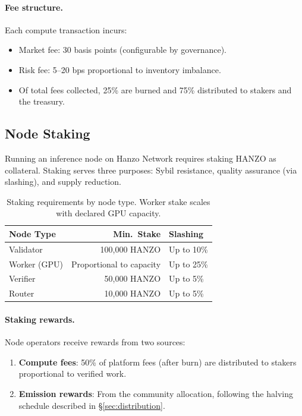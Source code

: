 \documentclass[11pt]{article}
\begin{document}
\paragraph{Fee structure.} Each compute transaction incurs:
\begin{itemize}[leftmargin=1.1em]
    \item Market fee: 30 basis points (configurable by governance).
    \item Risk fee: 5--20 bps proportional to inventory imbalance.
    \item Of total fees collected, 25\% are burned and 75\% distributed to
    stakers and the treasury.
\end{itemize}

\subsection{Node Staking}
\label{sec:staking}

Running an inference node on Hanzo Network requires staking HANZO as collateral.
Staking serves three purposes: Sybil resistance, quality assurance (via
slashing), and supply reduction.

\begin{table}[H]
\centering
\small
\begin{tabular}{lrl}
\toprule
\textbf{Node Type} & \textbf{Min.\ Stake} & \textbf{Slashing} \\
\midrule
Validator & 100,000 HANZO & Up to 10\% \\
Worker (GPU) & Proportional to capacity & Up to 25\% \\
Verifier & 50,000 HANZO & Up to 5\% \\
Router & 10,000 HANZO & Up to 5\% \\
\bottomrule
\end{tabular}
\caption{Staking requirements by node type. Worker stake scales with declared GPU capacity.}
\label{tab:staking}
\end{table}

\paragraph{Staking rewards.} Node operators receive rewards from two sources:
\begin{enumerate}[leftmargin=1.4em]
    \item \textbf{Compute fees}: 50\% of platform fees (after burn) are
    distributed to stakers proportional to verified work.
    \item \textbf{Emission rewards}: From the community allocation, following the
    halving schedule described in \S\ref{sec:distribution}.
\end{enumerate}
\end{document}

